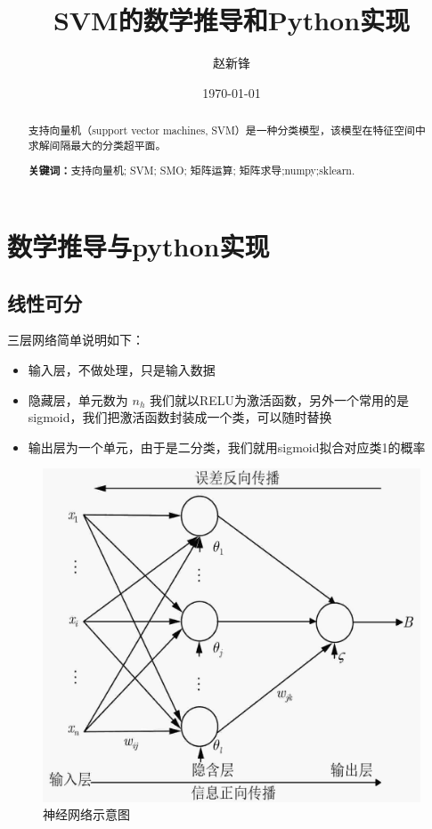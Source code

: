 \documentclass[12pt, a4paper, oneside]{ctexart}
\title{\textbf{SVM的数学推导和Python实现}}
\author{赵新锋}
\date{\today}
\begin{document}
\maketitle

\setcounter{page}{0}
\maketitle
\thispagestyle{empty}

\begin{abstract}
支持向量机（support vector machines, SVM）是一种分类模型，该模型在特征空间中求解间隔最大的分类超平面。
\par\textbf{关键词：}支持向量机; SVM; SMO; 矩阵运算; 矩阵求导;numpy;sklearn. 
\end{abstract}

\newpage
{}
\setcounter{page}{1}
\tableofcontents
\newpage
\setcounter{page}{1}


\newpage
\section{数学推导与python实现}

\subsection{线性可分}
三层网络简单说明如下：
\begin{itemize}
    \item 输入层，不做处理，只是输入数据
    \item 隐藏层，单元数为 $ n_h $ 我们就以RELU为激活函数，另外一个常用的是sigmoid，我们把激活函数封装成一个类，可以随时替换 
    \item 输出层为一个单元，由于是二分类，我们就用sigmoid拟合对应类1的概率
\end{itemize}
\begin{figure}[htbp]
    \centering
    \includegraphics[width=14cm]{bpnn.png}
    \caption{神经网络示意图}\label{fig1}
\end{figure}
\end{document}
